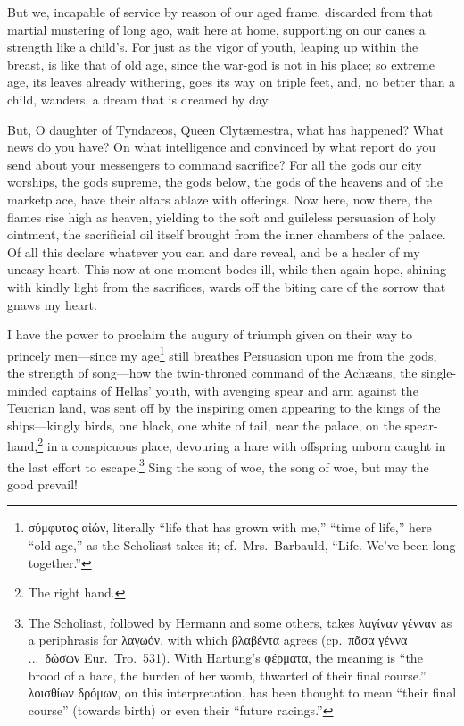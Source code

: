 \documentclass[12pt]{article}
\begin{document}
But we, incapable of service by reason of our aged frame, discarded from that martial mustering of long ago, wait here at home, supporting on our canes a strength like a child's. For just as the vigor of youth, leaping up within the breast, is like that of old age, since the war-god is not in his place; so extreme age, its leaves already withering, goes its way on triple feet, and, no better than a child, wanders, a dream that is dreamed by day.

But, O daughter of Tyndareos, Queen Clyt{\ae}mestra, what has happened? What news do you have? On what intelligence and convinced by what report do you send about your messengers to command sacrifice? For all the gods our city worships, the gods supreme, the gods below, the gods of the heavens and of the marketplace, have their altars ablaze with offerings. Now here, now there, the flames rise high as heaven, yielding to the soft and guileless persuasion of holy ointment, the sacrificial oil itself brought from the inner chambers of the palace. Of all this declare whatever you can and dare reveal, and be a healer of my uneasy heart. This now at one moment bodes ill, while then again hope, shining with kindly light from the sacrifices, wards off the biting care of the sorrow that gnaws my heart.

I have the power to proclaim the augury of triumph given on their way to princely men---since my age\footnote{σύμφυτος αἰών, literally ``life that has grown with me,'' ``time of life,'' here ``old age,'' as the Scholiast takes it; cf.~Mrs.~Barbauld, ``Life. We've been long together.''} still breathes Persuasion upon me from the gods, the strength of song---how the twin-throned command of the Ach{\ae}ans, the single-minded captains of Hellas' youth, with avenging spear and arm against the Teucrian land, was sent off by the inspiring omen appearing to the kings of the ships---kingly birds, one black, one white of tail, near the palace, on the spear-hand,\footnote{The right hand.} in a conspicuous place, devouring a hare with offspring unborn caught in the last effort to escape.\footnote{The Scholiast, followed by Hermann and some others, takes λαγίναν γένναν as a periphrasis for λαγωόν, with which βλαβέντα agrees (cp.~πᾶσα γέννα ...~δώσων Eur.~Tro.~531). With Hartung's φέρματα, the meaning is ``the brood of a hare, the burden of her womb, thwarted of their final course.'' λοισθίων δρόμων, on this interpretation, has been thought to mean ``their final course'' (towards birth) or even their ``future racings.''} Sing the song of woe, the song of woe, but may the good prevail!
\end{document}
